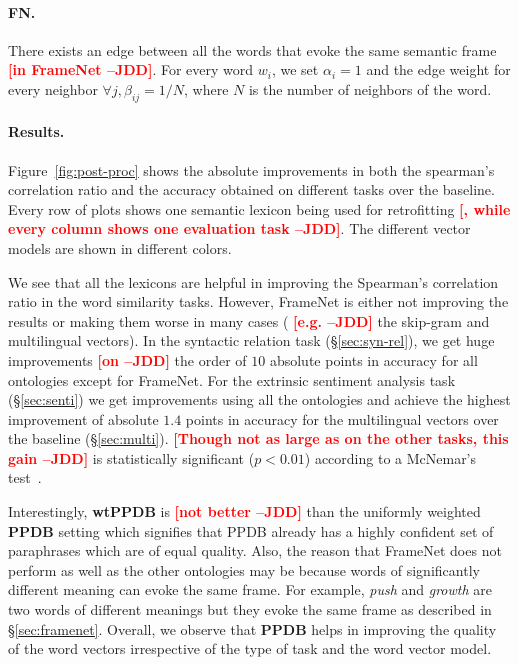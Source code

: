 \documentclass[11pt]{article}
\newcommand{\jdd}[1]{\textcolor{red}{\bf\small [#1 --JDD]}}
\begin{document}
\paragraph{FN.} There exists an edge between all the words that evoke the same 
semantic frame \jdd{in FrameNet}. For every word $w_i$, we set $\alpha_i = 1$ and the edge weight
for every neighbor $\forall j, \beta_{ij} = 1/N$, where $N$ is the number of neighbors of the word. 

\paragraph{Results.} Figure~\ref{fig:post-proc} shows the absolute improvements
in both the spearman's correlation ratio and the accuracy obtained on different
tasks over the baseline. Every row of plots shows one semantic lexicon being used
for retrofitting \jdd{, while every column shows one evaluation task}. The different vector models are shown in different colors. 

We see that all the lexicons are helpful in improving
the Spearman's correlation ratio in the word similarity tasks. However, FrameNet is
either not improving the results or  making them worse in many cases ( \jdd{e.g.} the skip-gram and multilingual vectors). In the syntactic relation task (\S\ref{sec:syn-rel}), 
we get huge improvements  \jdd{on} the order of $10$ absolute points
in accuracy for all ontologies except for FrameNet. For the extrinsic sentiment analysis task (\S\ref{sec:senti}) we get improvements using all the ontologies and achieve the highest improvement of absolute $1.4$ points in accuracy for the multilingual vectors over the baseline (\S\ref{sec:multi}). \jdd{Though not as large as on the other tasks, this gain} 
is statistically significant ($p<0.01$) according to a McNemar's test~\cite{Dietterich98approximatestatistical}.

Interestingly, \textbf{wtPPDB} is \jdd{not better}  than 
the uniformly weighted \textbf{PPDB} 
setting which signifies that PPDB already has a highly confident
set of paraphrases which are of equal quality. 
Also, the reason that FrameNet does not perform as well as the other 
ontologies may be because words of significantly different meaning can evoke the 
same frame. For example, \textit{push} and \textit{growth} are two words of 
different meanings but they evoke the same frame as described in \S\ref{sec:framenet}.
Overall, we observe that \textbf{PPDB} helps in improving the quality of the word vectors
irrespective of the type of task and the word vector model.
\end{document}
